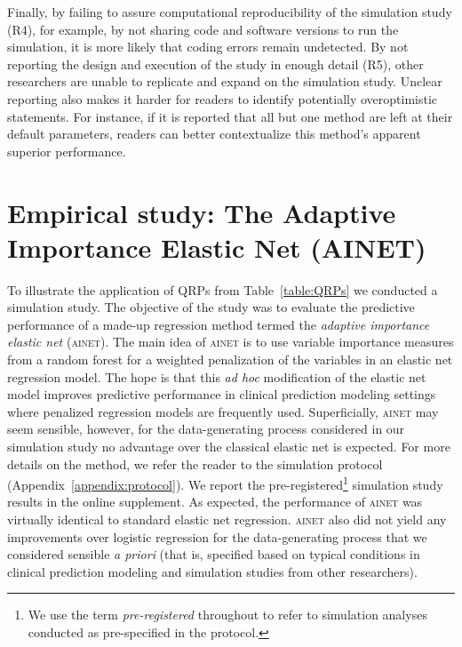 \documentclass[a4paper, 11pt]{article}
\newcommand{\ainet}{\textsc{ainet}}
\begin{document}
Finally, by failing to assure computational reproducibility of the simulation study (R4),
for example, by not sharing code and software versions to run the simulation,
it is more likely that coding errors remain undetected. By not reporting the design and
execution of the study in enough detail (R5), other researchers are unable to replicate
and expand on the simulation study.
Unclear reporting also makes it harder for readers to identify potentially overoptimistic
statements. For instance, if it is reported that all but one method are left at their
default parameters, readers can better contextualize this method's apparent superior
performance.


\section{Empirical study: The Adaptive Importance Elastic Net
  (AINET)} \label{sec:study}

To illustrate the application of QRPs from Table~\ref{table:QRPs} we conducted
a simulation study. The objective of the study was to evaluate the predictive
performance of a made-up regression method termed the \emph{adaptive importance
elastic net} (\ainet). The main idea of \ainet{} is to use variable
importance measures from a random forest for a weighted penalization of the
variables in an elastic net regression model. The hope is that this \emph{ad hoc}
modification of the elastic net model improves predictive performance in clinical prediction modeling
settings where penalized regression models are frequently used. Superficially,
\ainet{} may seem sensible, however, for the data-generating process
considered in our simulation study no
advantage over the classical elastic net is expected. For more details
on the method, we refer the reader to the simulation protocol (Appendix~\ref{appendix:protocol}).
We report the pre-registered\footnote{We use the term \emph{pre-registered} throughout to
refer to simulation analyses conducted as pre-specified in the protocol.} simulation study
results in the online supplement. As expected,
the performance of \ainet{} was virtually identical to standard elastic net
regression.  \ainet{} also did not yield any improvements over logistic
regression for the data-generating process that we considered sensible
\emph{a priori} (that is, specified based on typical conditions
in clinical prediction modeling and simulation studies
from other researchers).
\end{document}
